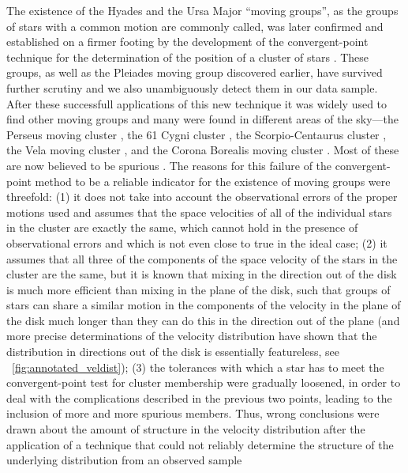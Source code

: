 The existence of the Hyades and the Ursa Major ``moving groups'', as
the groups of stars with a common motion are commonly called, was
later confirmed and established on a firmer footing by the development
of the convergent-point technique for the determination of the
position of a cluster of stars
\citep{boss08a,1909ApJ....30..135H}. These groups, as well as the
Pleiades moving group discovered earlier, have survived further
scrutiny
\citep{1938AJ.....47...49R,1949ApJ...110..205R,1998AJ....115.2384D}
and we also unambiguously detect them in our data sample. After these
successfull applications of this new technique it was widely used to
find other moving groups and many were found in different areas of the
sky---the Perseus moving cluster \citep{1910MNRAS..71...43E}, the 61
Cygni cluster \citep{1911AJ.....27...33B,1912AJ.....27...96R}, the
Scorpio-Centaurus cluster \citep{1913MNRAS..73..492P}, the Vela moving
cluster \citep{1914ApJ....40...43K}, and the Corona Borealis moving
cluster \citep{rasmuson21}. Most of these are now believed to be
spurious \citep[\eg][]{rasmuson21,1940MNRAS.100..574C}. The reasons
for this failure of the convergent-point method to be a reliable
indicator for the existence of moving groups were threefold: (1) it
does not take into account the observational errors of the proper
motions used and assumes that the space velocities of all of the
individual stars in the cluster are exactly the same, which cannot
hold in the presence of observational errors and which is not even
close to true in the ideal case; (2) it assumes that all three of the
components of the space velocity of the stars in the cluster are the
same, but it is known that mixing in the direction out of the disk is
much more efficient than mixing in the plane of the disk, such that
groups of stars can share a similar motion in the components of the
velocity in the plane of the disk much longer than they can do this in
the direction out of the plane (and more precise determinations of the
velocity distribution have shown that the distribution in directions
out of the disk is essentially featureless, see
\figurename~\ref{fig:annotated_veldist}); (3) the tolerances with
which a star has to meet the convergent-point test for cluster
membership were gradually loosened, in order to deal with the
complications described in the previous two points, leading to the
inclusion of more and more spurious members. Thus, wrong conclusions
were drawn about the amount of structure in the velocity distribution
after the application of a technique that could not reliably determine
the structure of the underlying distribution from an observed sample
